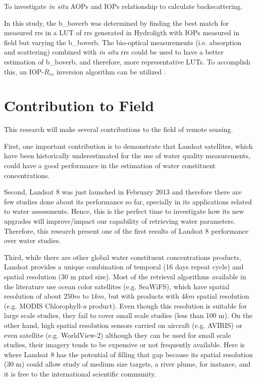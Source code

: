 \begin{enumerate}
			{\bf \item To investigate {\it in situ} AOPs and IOPs relationship to calculate backscattering.}

In this study, the \gls{b_boverb} was determined by finding the best match for measured \gls{rrs} in a LUT of \gls{rrs} generated in Hydroligth with IOPs measured in field but varying the \gls{b_boverb}. The bio-optical measurements (i.e. absorption and scattering) combined with {\it in situ} \gls{rrs} could be used to have a better estimation of \gls{b_boverb}, and therefore, more representative LUTs. To accomplish this, an IOP-$R_{rs}$ inversion algorithm can be utilized \cite{Morel:1977rw,Lee2002_invQAA,Werdell2013_inv}.	

	\end{enumerate}	

		

\section{Contribution to Field}
\label{sec:contributiontofield}
This research will make several contributions to the field of remote sensing.

First, one important contribution is to demonstrate that Landsat satellites, which have been historically underestimated for the use of water quality measurements, could have a good performance in the estimation of water constituent concentrations.

Second, Landsat 8 was just launched in February 2013 and therefore there are few studies done about its performance so far, specially in its applications related to water assessments. Hence, this is the perfect time to investigate how its new upgrades will improve/impact our capability of retrieving water parameters. Therefore, this research present one of the first results of Landsat 8 performance over water studies.  

Third, while there are other global water constituent concentrations products, Landsat provides a unique combination of temporal (16 days repeat cycle) and spatial resolution (30 m pixel size). Most of the retrieval algorithms available in the literature use ocean color satellites (e.g. SeaWiFS), which have spatial resolution of about $250 m$ to $1 km$, but with products with $4km$ spatial resolution (e.g. MODIS Chlorophyll-{\it a} product). Even though this resolution is suitable for large scale studies, they fail to cover small scale studies (less than 100 m). On the other hand, high spatial resolution sensors carried on aircraft (e.g. AVIRIS) or even satellite (e.g. WorldView-2) although they can be used for small scale studies, their imagery tends to be expensive or not frequently available. Here is where Landsat 8 has the potential of filling that gap because its spatial resolution (30 m) could allow study of medium size targets, a river plume, for instance, and it is free to the international scientific community.

